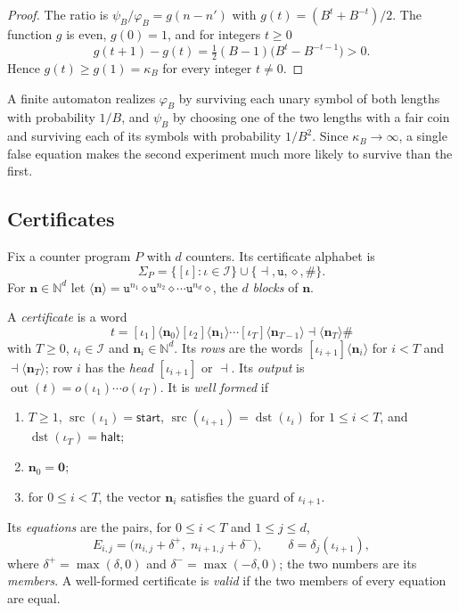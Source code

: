 \documentclass[11pt]{article}
\theoremstyle{plain}
\theoremstyle{definition}
\theoremstyle{remark}
\newcommand{\N}{\mathbb N}
\newcommand{\start}{\mathsf{start}}
\newcommand{\halt}{\mathsf{halt}}
\newcommand{\un}{\mathtt{u}}
\newcommand{\fin}{\dashv}
\newcommand{\enc}[1]{\langle #1\rangle}
\newcommand{\src}{\operatorname{src}}
\newcommand{\dst}{\operatorname{dst}}
\newcommand{\out}{\operatorname{out}}
\newcommand{\cI}{\mathcal I}
\begin{document}
\begin{proof}
The ratio is $\psi_B/\varphi_B=g(n-n')$ with $g(t)=(B^t+B^{-t})/2$. The function $g$ is even, $g(0)=1$, and for integers $t\ge0$
\[
g(t+1)-g(t)=\tfrac12(B-1)\bigl(B^t-B^{-t-1}\bigr)>0 .
\]
Hence $g(t)\ge g(1)=\kappa_B$ for every integer $t\ne0$.
\end{proof}

A finite automaton realizes $\varphi_B$ by surviving each unary symbol of both lengths with probability $1/B$, and $\psi_B$ by choosing one of the two lengths with a fair coin and surviving each of its symbols with probability $1/B^2$. Since $\kappa_B\to\infty$, a single false equation makes the second experiment much more likely to survive than the first.

\subsection{Certificates}

Fix a counter program $P$ with $d$ counters. Its certificate alphabet is
\[
\Sigma_P=\{[\iota]:\iota\in\cI\}\cup\{\fin,\un,\diamond,\#\}.
\]
For $\mathbf n\in\N^d$ let $\enc{\mathbf n}=\un^{n_1}\diamond\un^{n_2}\diamond\cdots\un^{n_d}\diamond$, the $d$ \emph{blocks} of $\mathbf n$.

\begin{definition}\label{def:certificate}
A \emph{certificate} is a word
\[
t=[\iota_1]\enc{\mathbf n_0}[\iota_2]\enc{\mathbf n_1}\cdots[\iota_T]\enc{\mathbf n_{T-1}}\fin\enc{\mathbf n_T}\#
\]
with $T\ge0$, $\iota_i\in\cI$ and $\mathbf n_i\in\N^d$. Its \emph{rows} are the words $[\iota_{i+1}]\enc{\mathbf n_i}$ for $i<T$ and $\fin\enc{\mathbf n_T}$; row $i$ has the \emph{head} $[\iota_{i+1}]$ or $\fin$. Its \emph{output} is $\out(t)=o(\iota_1)\cdots o(\iota_T)$. It is \emph{well formed} if
\begin{enumerate}[label=(W\arabic*)]
\item $T\ge1$, $\src(\iota_1)=\start$, $\src(\iota_{i+1})=\dst(\iota_i)$ for $1\le i<T$, and $\dst(\iota_T)=\halt$;
\item $\mathbf n_0=\mathbf 0$;
\item for $0\le i<T$, the vector $\mathbf n_i$ satisfies the guard of $\iota_{i+1}$.
\end{enumerate}
Its \emph{equations} are the pairs, for $0\le i<T$ and $1\le j\le d$,
\[
E_{i,j}=\bigl(n_{i,j}+\delta^+,\;n_{i+1,j}+\delta^-\bigr),\qquad \delta=\delta_j(\iota_{i+1}),
\]
where $\delta^+=\max(\delta,0)$ and $\delta^-=\max(-\delta,0)$; the two numbers are its \emph{members}. A well-formed certificate is \emph{valid} if the two members of every equation are equal.
\end{definition}
\end{document}

